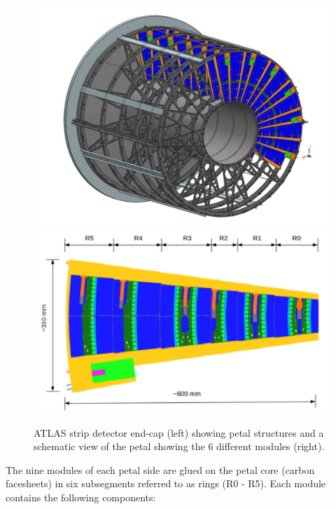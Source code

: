 		\begin{figure}[ht!]
			\centering
			\captionsetup{justification=centering,margin=2cm}
			\includegraphics[scale=0.25]{Figures/Chapter02/EndCap.jpg}
			\includegraphics[scale=0.26]{Figures/Chapter02/PetalDesign.jpg}
			\caption{ATLAS strip detector end-cap (left) showing petal structures and a schematic view of the petal showing the 6 different modules (right).}\label{fig2.1}
		\end{figure}
		
		The nine modules of each petal side are glued on the petal core (carbon facesheets) in six subsegments referred to as rings (R0 - R5). Each module contains the following components:
		
